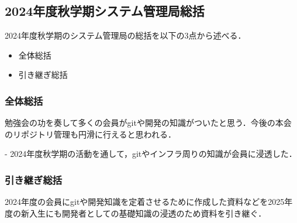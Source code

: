 \subsection*{2024年度秋学期システム管理局総括}


2024年度秋学期のシステム管理局の総括を以下の3点から述べる．
\begin{itemize}
    \item 全体総括
    \item 引き継ぎ総括
\end{itemize}

\subsubsection*{全体総括}
勉強会の功を奏して多くの会員がgitや開発の知識がついたと思う．今後の本会のリポジトリ管理も円滑に行えると思われる．

- 2024年度秋学期の活動を通して，gitやインフラ周りの知識が会員に浸透した．

\subsubsection*{引き継ぎ総括}
2024年度の会員にgitや開発知識を定着させるために作成した資料などを2025年度の新入生にも開発者としての基礎知識の浸透のため資料を引き継ぐ．
